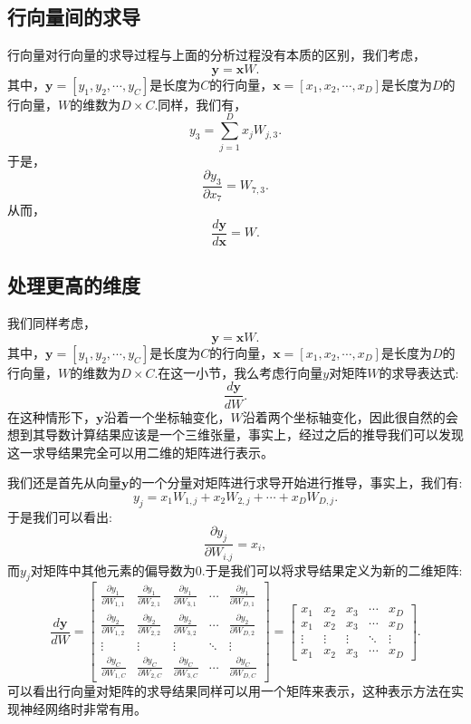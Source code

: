 \documentclass{ctexart}
\begin{document}
\subsection{行向量间的求导}
行向量对行向量的求导过程与上面的分析过程没有本质的区别，我们考虑，
$$\mathbf{y} = \mathbf{x}W.$$
其中，$\mathbf{y} = [y_1,y_2,\cdots,y_C]$是长度为$C$的行向量，$\mathbf{x}=[x_1,x_2,\cdots,x_D]$是长度为$D$的行向量，$W$的维数为$D×C.$同样，我们有，
$$y_3 = \sum_{j=1}^{D}x_jW_{j,3}.$$
于是，
$$\frac{\partial{y_3}}{\partial{x_7}}=W_{7,3}.$$
从而，
$$\frac{d{\mathbf{y}}}{d\mathbf{x}} = W.$$
\subsection{处理更高的维度}
我们同样考虑，
$$\mathbf{y} = \mathbf{x}W.$$
其中，$\mathbf{y} = [y_1,y_2,\cdots,y_C]$是长度为$C$的行向量，$\mathbf{x}=[x_1,x_2,\cdots,x_D]$是长度为$D$的行向量，$W$的维数为$D×C$.在这一小节，我么考虑行向量$y$对矩阵$W$的求导表达式:
$$\frac{d\mathbf{y}}{dW}.$$
在这种情形下，$\mathbf{y}$沿着一个坐标轴变化，$W$沿着两个坐标轴变化，因此很自然的会想到其导数计算结果应该是一个三维张量，事实上，经过之后的推导我们可以发现这一求导结果完全可以用二维的矩阵进行表示。

我们还是首先从向量$\mathbf{y}$的一个分量对矩阵进行求导开始进行推导，事实上，我们有:
$$y_j = x_1W_{1,j}+x_2W_{2,j}+\cdots+x_DW_{D,j}.$$
于是我们可以看出:
$$\frac{\partial{y_j}}{\partial W_{i.j}} = x_i,$$
而$y_{j}$对矩阵中其他元素的偏导数为0.于是我们可以将求导结果定义为新的二维矩阵:
\begin{equation*}
\frac{d\mathbf{y}}{dW}=
\left[
\begin{matrix}
\frac{\partial y_1}{\partial W_{1,1}} & \frac{\partial y_1}{\partial W_{2,1}} & \frac{\partial y_1}{\partial W_{3,1}} & \cdots & \frac{\partial y_1}{\partial W_{D,1}}\\
\frac{\partial y_2}{\partial W_{1,2}} & \frac{\partial y_2}{\partial W_{2,2}} & \frac{\partial y_2}{\partial W_{3,2}} & \cdots & \frac{\partial y_2}{\partial W_{D,2}}\\
\vdots & \vdots & \vdots & \ddots & \vdots\\
\frac{\partial y_C}{\partial W_{1,C}} & \frac{\partial y_C}{\partial W_{2,C}} & \frac{\partial y_C}{\partial W_{3,C}} & \cdots & \frac{\partial y_C}{\partial W_{D,C}}
\end{matrix}
\right] = 
\left[
\begin{matrix}
x_1 & x_2 & x_3 & \cdots & x_D\\
x_1 & x_2 & x_3 & \cdots & x_D\\
\vdots & \vdots & \vdots & \ddots & \vdots\\
x_1 & x_2 & x_3 & \cdots & x_D
\end{matrix}
\right].
\end{equation*}
可以看出行向量对矩阵的求导结果同样可以用一个矩阵来表示，这种表示方法在实现神经网络时非常有用。
\end{document}
